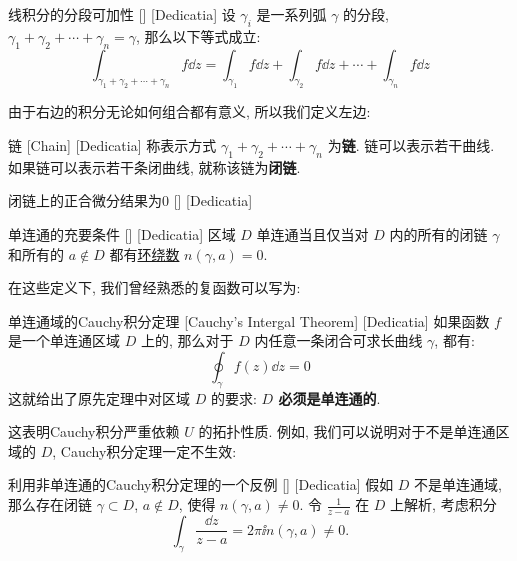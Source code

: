 \documentclass[UTF8]{ctexart}
\begin{document}
        \begin{ppt}
            [UUID]
            {线积分的分段可加性}
            []
            [Dedicatia]
            设 \(\gamma_i\) 是一系列弧 \(\gamma\) 的分段,  \(\gamma_1+\gamma_2+\cdots+\gamma_n=\gamma\), 那么以下等式成立: 
            \[\int_{\gamma_1+\gamma_2+\cdots+\gamma_n}f\dd{z}=\int_{\gamma_1}f\dd{z}+\int_{\gamma_2}f\dd{z}+\cdots+\int_{\gamma_n}f\dd{z}\]
        \end{ppt}

        由于右边的积分无论如何组合都有意义, 所以我们定义左边: 

        \begin{dfn}
            [UUID]
            {链}
            [Chain]
            [Dedicatia]
            称表示方式 \(\gamma_1+\gamma_2+\cdots+\gamma_n\) 为\textbf{链}. 链可以表示若干曲线. 如果链可以表示若干条闭曲线, 就称该链为\textbf{闭链}. 
        \end{dfn}

        \begin{ppt}
            [UUID]
            {闭链上的正合微分结果为0}
            []
            [Dedicatia]
        \end{ppt}

        \begin{thm}
            [UUID]
            {单连通的充要条件}
            []
            [Dedicatia]
            区域 \(D\) 单连通当且仅当对 \(D\) 内的所有的闭链 \(\gamma\) 和所有的 \(a\notin D\) 都有\hyperref[dfn:WindingNumber]{环绕数} \(n(\gamma,a)=0\).
        \end{thm}

        在这些定义下, 我们曾经熟悉的复函数可以写为: 

        \begin{thm}
            [UUID]
            {单连通域的Cauchy积分定理}
            [Cauchy's Intergal Theorem]
            [Dedicatia]
            如果函数 \(f\) 是一个单连通区域 \(D\) 上的, 那么对于 \(D\) 内任意一条闭合可求长曲线 \(\gamma\), 都有: 
            \[\oint_{\gamma} f(z) \dd z = 0\]
            这就给出了原先定理中对区域 \(D\) 的要求: \textbf{ \(D\) 必须是单连通的}. 
        \end{thm}

        这表明Cauchy积分严重依赖 \(U\) 的拓扑性质. 例如, 我们可以说明对于不是单连通区域的 \(D\), Cauchy积分定理一定不生效: 

        \begin{cxmp}
            [UUID]
            {利用非单连通的Cauchy积分定理的一个反例}
            []
            [Dedicatia]
            假如 \(D\) 不是单连通域, 那么存在闭链 \(\gamma\subset D\),  \(a\notin D\), 使得 \(n(\gamma,a)\neq 0\). 令 \(\frac{1}{z-a}\) 在 \(D\) 上解析, 考虑积分
            \[\int_\gamma\frac{\dd{z}}{z-a}=2\pi\ii n(\gamma,a)\neq 0.\]
        \end{cxmp}
\end{document}

